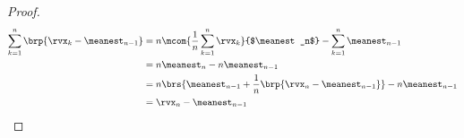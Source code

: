 \begin{lemma}
\label{lem:meanest}
\end{lemma}
\begin{proof}
\begin{align*}
  \sum_{k=1}^n \brp{ \rvx_k - \meanest_{n-1} }
    &= n\mcom{\frac{1}{n}\sum_{k=1}^n \rvx_k}{$\meanest_n$} - \sum_{k=1}^n \meanest_{n-1}
  \\&= n\meanest_n - n\meanest_{n-1}
  \\&= n \brs{ \meanest_{n-1} + \frac{1}{n}\brp{\rvx_n - \meanest_{n-1}} } - n\meanest_{n-1}
  \\&= \rvx_n - \meanest_{n-1}
\end{align*}
\end{proof}

